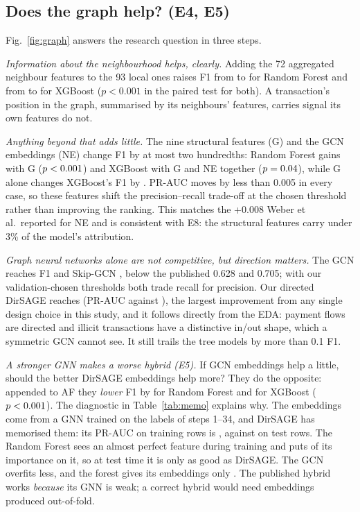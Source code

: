 \subsection{Does the graph help? (E4, E5)}

Fig.~\ref{fig:graph} answers the research question in
three steps.

\emph{Information about the neighbourhood helps, clearly.} Adding the 72
aggregated neighbour features to the 93 local ones raises F1 from
\GraphRFLFFone{} to \GraphRFAFFone{} for Random Forest and from
\GraphXGBLFFone{} to \GraphXGBAFFone{} for XGBoost ($p<0.001$ in the paired test
for both). A transaction's position in the graph, summarised by its neighbours'
features, carries signal its own features do not.

\emph{Anything beyond that adds little.} The nine structural features (G) and the
GCN embeddings (NE) change F1 by at most two hundredths: Random Forest gains
\GraphPairedRFAFGFoneDiff{} with G ($p<0.001{}$) and XGBoost
\GraphPairedXGBAFGNEFoneDiff{} with G and NE together
($p=0.04{}$), while G alone changes XGBoost's F1 by
\GraphPairedXGBAFGFoneDiff{}. PR-AUC moves by less than 0.005 in
every case, so these features shift the precision--recall trade-off at the
chosen threshold rather than improving the ranking. This matches the
+0.008 Weber et al.\ reported for NE and is consistent with E8: the
structural features carry under 3\% of the model's attribution.

\emph{Graph neural networks alone are not competitive, but direction matters.}
The GCN reaches F1 \GraphGCNgraphFone{} and Skip-GCN
\GraphSkipGCNgraphFone{}, below the published 0.628 and 0.705; with our
validation-chosen thresholds both trade recall for precision. Our directed DirSAGE reaches
\GraphDirSAGEgraphFone{} (PR-AUC \GraphDirSAGEgraphPRAUC{} against
\GraphGCNgraphPRAUC{}), the largest improvement from any single design choice
in this study, and it follows directly from the EDA: payment flows are directed
and illicit transactions have a distinctive in/out shape, which a symmetric GCN
cannot see. It still trails the tree models by more than 0.1 F1.

\emph{A stronger GNN makes a worse hybrid (E5).} If GCN embeddings help a
little, should the better DirSAGE embeddings help more? They do the opposite:
appended to AF they \emph{lower} F1 by \HybRFFoneDrop{} for Random Forest and
\HybXGBFoneDrop{} for XGBoost ($p<0.001{}$). The diagnostic in
Table~\ref{tab:memo} explains why. The embeddings come from a GNN trained on the
labels of steps 1--34, and DirSAGE has memorised them: its PR-AUC on training
rows is \MemDirSAGETrainPRAUC{}, against \MemDirSAGETestPRAUC{} on test rows. The
Random Forest sees an almost perfect feature during training and puts
\MemDirSAGERFImp{} of its importance on it, so at test time it is only as good
as DirSAGE. The GCN overfits less, and the forest gives its embeddings only
\MemGCNRFImp{}. The published hybrid works \emph{because} its GNN is weak; a
correct hybrid would need embeddings produced out-of-fold.

